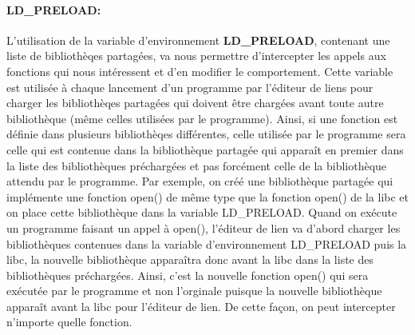 \paragraph{LD\_PRELOAD:}

L'utilisation de la variable d'environnement
\textbf{LD\_PRELOAD}\citet{INTERCEPTION:LD_PRELOAD}, contenant une liste de
bibliothèqes partagées, va nous permettre d'intercepter les appels aux fonctions
qui nous intéressent et d'en modifier le comportement. Cette variable est
utilisée à chaque lancement d'un programme par l'éditeur de liens pour charger
les bibliothèqes partagées qui doivent être chargées avant toute autre
bibliothèque (même celles utilisées par le programme). Ainsi, si une fonction
est définie dans plusieurs bibliothèqes différentes, celle utilisée par le
programme sera celle qui est contenue dans la bibliothèque partagée qui apparaît
en premier dans la liste des bibliothèques préchargées et pas forcément celle de
la bibliothèque attendu par le programme. Par exemple, on créé une bibliothèque
partagée qui implémente une fonction open() de même type que la fonction open()
de la libc et on place cette bibliothèque dans la variable LD\_PRELOAD. Quand on
exécute un programme faisant un appel à open(), l'éditeur de lien va d'abord
charger les bibliothèques contenues dans la variable d'environnement LD\_PRELOAD
puis la libc, la nouvelle bibliothèque apparaîtra donc avant la libc dans la
liste des bibliothèques préchargées. Ainsi, c'est la nouvelle fonction open()
qui sera exécutée par le programme et non l'orginale puisque la nouvelle
bibliothèque apparaît avant la libc pour l'éditeur de lien. De cette façon, on
peut intercepter n'importe quelle fonction.


